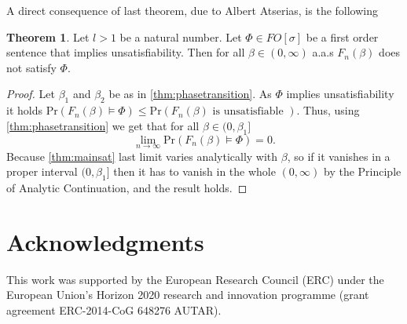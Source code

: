 \documentclass[12pt,notitlepage,a4paper]{article}
\theoremstyle{definition}
\newtheorem{theorem}{Theorem}[section]
\newcommand{\Ln}{\lim\limits_{n\to \infty}}
\newcommand{\PR}[1]{\mathrm{Pr}\left(#1\right)}
\begin{document}
A direct consequence of last theorem, due to Albert Atserias, is the following

\begin{theorem} \label{thm:satapplication}
	Let $l>1$ be a natural number. Let $\Phi\in FO[\sigma]$ be a first order
	sentence that implies unsatisfiability.  Then for all $\beta\in (0,\infty)$
	a.a.s $F_n(\beta)$ does not satisfy $\Phi$.
\end{theorem}
\begin{proof}
	Let $\beta_1$ and $\beta_2$ be as in \cref{thm:phasetransition}. 
	As $\Phi$ implies unsatisfiability it holds
	$\PR{F_n(\beta)\models \Phi  }\leq  
	\PR{F_n(\beta) \text{ is unsatisfiable }  }$. Thus, using \cref{thm:phasetransition}
	we get that for all $\beta\in (0,\beta_1]$
	\[
	\Ln \PR{F_n(\beta)\models \Phi  }=0.
	\]
	Because \cref{thm:mainsat} last limit varies analytically with $\beta$, so
	if it vanishes in a proper interval $(0,\beta_1]$ then it has to vanish
	in the whole $(0,\infty)$ by the Principle of Analytic Continuation, and the result 
	holds. 
\end{proof}




\section*{Acknowledgments}
This work was supported by the European Research Council (ERC) under the European Union's 
Horizon 2020 research and innovation programme (grant agreement ERC-2014-CoG 648276 AUTAR).\par
{}



	
\end{document}
